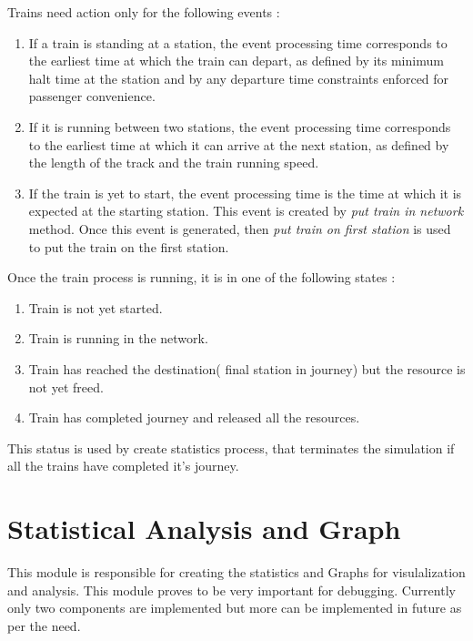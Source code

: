 Trains need action only for the following events :
\begin{enumerate}
\item If a train is standing at a station, the event processing time 
    corresponds to the earliest time at which the train can depart,   
    as defined by its minimum halt time at the station and by any     
    departure time constraints enforced for passenger convenience.
\item If it is running between two stations, the event processing time        
    corresponds to the earliest time at which it can arrive at the         
    next station, as defined by the length of the track and the train      
    running speed.

\item  If the train is yet to start, the event processing                      
    time is the time at which it is expected at the starting station. This event is created 
    by \textit{put train in network} method. Once this event is generated, then \textit{put train on 
    first station} is used to put the train on the first station.

\end{enumerate}


Once the train process is running, it is in one of the following states :
\begin {enumerate}
\item Train is not yet started.
\item Train is running in the network.
\item Train has reached the destination( final station in journey) but the resource is not yet freed.
\item Train has completed journey and released all the resources.
\end {enumerate}

This status is used by create statistics process, that terminates the simulation if all the trains have completed it's 
journey.




\section{Statistical Analysis and Graph}

This module is responsible for creating the statistics and Graphs for visulalization and analysis. This 
module proves to be very important for debugging. Currently only two components are implemented but more
can be implemented in future as per the need.

